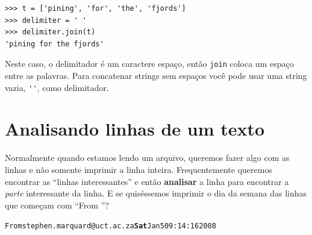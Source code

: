 
\beforeverb
\begin{verbatim}
>>> t = ['pining', 'for', 'the', 'fjords']
>>> delimiter = ' '
>>> delimiter.join(t)
'pining for the fjords'
\end{verbatim}
\afterverb
%

Neste caso, o delimitador é um caractere espaço, então
{\tt join} coloca um espaço entre as palavras. Para concatenar
strings sem espaços você pode usar uma string vazia, \verb"''",
como delimitador.


\section{Analisando linhas de um texto}

Normalmente quando estamos lendo um arquivo,
queremos fazer algo com as linhas e não somente
imprimir a linha inteira. Frequentemente queremos 
encontrar as ``linhas interessantes'' e então {\bf analisar}
a linha para encontrar a \emph{parte} interessante da linha.
E se quiséssemos imprimir o dia da semana das linhas que começam com
``From ''?

\beforeverb
\begin{alltt}
From stephen.marquard@uct.ac.za {\bf Sat} Jan  5 09:14:16 2008
\end{alltt}
\afterverb

